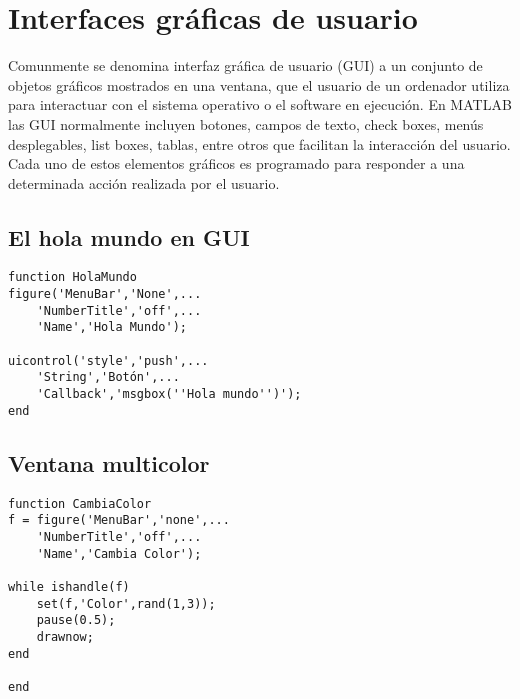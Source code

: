 \chapter{Interfaces gráficas de usuario}

Comunmente se denomina interfaz gráfica de usuario (GUI) a un conjunto de objetos gráficos mostrados en una 
ventana, que el usuario de un ordenador utiliza para interactuar con el sistema operativo o el software en 
ejecución. En MATLAB las GUI normalmente incluyen botones, campos de texto, check boxes, menús desplegables, 
list boxes, tablas, entre otros que facilitan la interacción del usuario. Cada uno de estos elementos gráficos 
es programado para responder a una determinada acción realizada por el usuario.

\section{El hola mundo en GUI}


\sol

\begin{verbatim}
function HolaMundo
figure('MenuBar','None',...
    'NumberTitle','off',...
    'Name','Hola Mundo');
 
uicontrol('style','push',...
    'String','Botón',...
    'Callback','msgbox(''Hola mundo'')');
end
\end{verbatim}

\section{Ventana multicolor}


\sol

\begin{verbatim}
function CambiaColor
f = figure('MenuBar','none',...
    'NumberTitle','off',...
    'Name','Cambia Color');
 
while ishandle(f)
    set(f,'Color',rand(1,3));
    pause(0.5);
    drawnow;
end
 
end
\end{verbatim}


